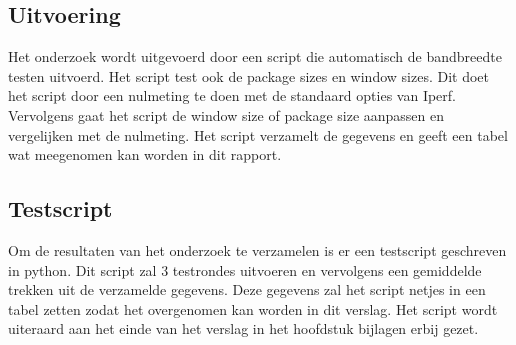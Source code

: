 \documentclass[../DCM2_Verslag.tex]{subfiles}
\begin{document}
\subsection{Uitvoering}
Het onderzoek wordt uitgevoerd door een script die automatisch de bandbreedte testen uitvoerd. Het script test ook de package sizes en window sizes. Dit doet het script door een nulmeting te doen met de standaard opties van Iperf. Vervolgens gaat het script de window size of package size aanpassen en vergelijken met de nulmeting. Het script verzamelt de gegevens en geeft een tabel wat meegenomen kan worden in dit rapport.

\subsection{Testscript}
Om de resultaten van het onderzoek te verzamelen is er een testscript geschreven in python. Dit script zal 3 testrondes uitvoeren en vervolgens een gemiddelde trekken uit de verzamelde gegevens.
Deze gegevens zal het script netjes in een tabel zetten zodat het overgenomen kan worden in dit verslag. Het script wordt uiteraard aan het einde van het verslag in het hoofdstuk bijlagen erbij gezet.
\end{document}
